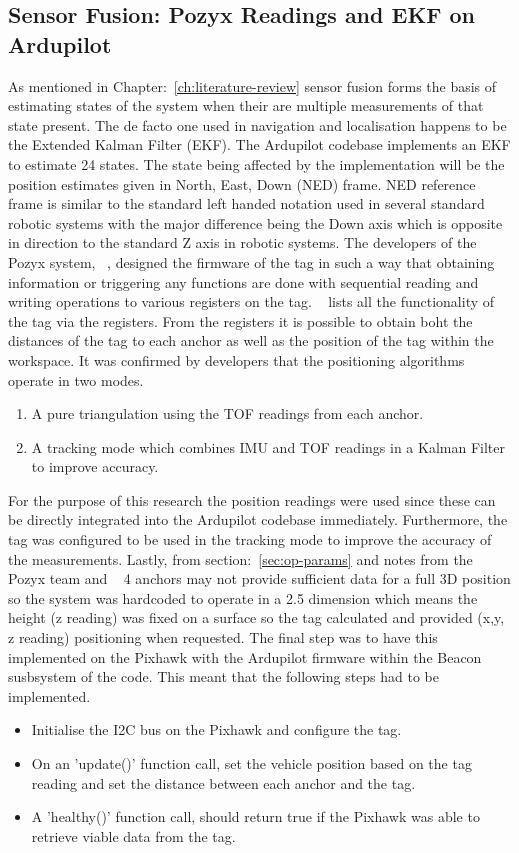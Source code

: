 \subsection{Sensor Fusion: Pozyx Readings and EKF on Ardupilot}\label{subsec:sensor-fusion}
As mentioned in Chapter:~\ref{ch:literature-review} sensor fusion forms the basis of estimating states of the system when their are multiple measurements of that state present.
The de facto one used in navigation and localisation happens to be the Extended Kalman Filter (EKF).
The Ardupilot codebase implements an EKF to estimate 24 states.
The state being affected by the implementation will be the position estimates given in North, East, Down (NED) frame.
NED reference frame is similar to the standard left handed notation used in several standard robotic systems with the major difference being the Down axis which is opposite in direction to the standard Z axis in robotic systems.
The developers of the Pozyx system, ~\cite{pozyx2018pozyx}, designed the firmware of the tag in such a way that obtaining information or triggering any functions are done with sequential reading and writing operations to various registers on the tag.
~\citet{devregs} lists all the functionality of the tag via the registers.
From the registers it is possible to obtain boht the distances of the tag to each anchor as well as the position of the tag within the workspace.
It was confirmed by developers that the positioning algorithms operate in two modes.
\begin{enumerate}
    \item A pure triangulation using the TOF readings from each anchor.
    \item A tracking mode which combines IMU and TOF readings in a Kalman Filter to improve accuracy.
\end{enumerate}
For the purpose of this research the position readings were used since these can be directly integrated into the Ardupilot codebase immediately.
Furthermore, the tag was configured to be used in the tracking mode to improve the accuracy of the measurements.
Lastly, from section:~\ref{sec:op-params} and notes from the Pozyx team and ~\citet{evaluwb} 4 anchors may not provide sufficient data for a full 3D position so the system was hardcoded to operate in a 2.5 dimension which means the height (z reading) was fixed on a surface so the tag calculated and provided (x,y, z reading) positioning when requested.
The final step was to have this implemented on the Pixhawk with the Ardupilot firmware within the Beacon susbsystem of the code.
This meant that the following steps had to be implemented.
\begin{itemize}
    \item Initialise the I2C bus on the Pixhawk and configure the tag.
    \item On an 'update()' function call, set the vehicle position based on the tag reading and set the distance between each anchor and the tag.
    \item A 'healthy()' function call, should return true if the Pixhawk was able to retrieve viable data from the tag.
\end{itemize}

